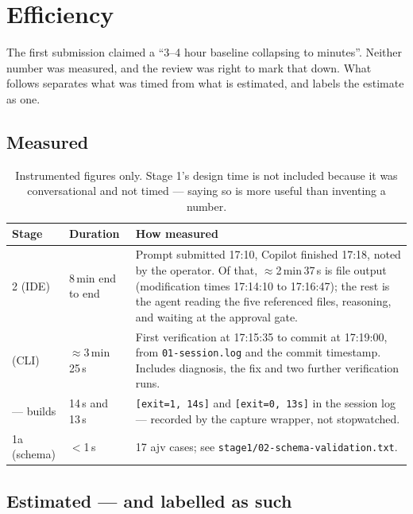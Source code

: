 \documentclass[11pt,a4paper]{article}
\newcommand{\code}[1]{\texttt{\small #1}}
\begin{document}
\section{Efficiency}

The first submission claimed a ``3--4 hour baseline collapsing to minutes''.
Neither number was measured, and the review was right to mark that down. What
follows separates what was timed from what is estimated, and labels the
estimate as one.

\subsection{Measured}

\begin{table}[h]
\centering
\small
\begin{tabularx}{\textwidth}{@{}l l X@{}}
\toprule
\textbf{Stage} & \textbf{Duration} & \textbf{How measured} \\
\midrule
2 (IDE) & 8\,min end to end
  & Prompt submitted 17:10, Copilot finished 17:18, noted by the operator.
    Of that, $\approx$2\,min\,37\,s is file output (modification times
    17:14:10 to 17:16:47); the rest is the agent reading the five referenced
    files, reasoning, and waiting at the approval gate. \\
\addlinespace
3 (CLI) & $\approx$3\,min\,25\,s
  & First verification at 17:15:35 to commit at 17:19:00, from
    \code{01-session.log} and the commit timestamp. Includes diagnosis, the
    fix and two further verification runs. \\
\addlinespace
--- builds & 14\,s and 13\,s
  & \code{[exit=1, 14s]} and \code{[exit=0, 13s]} in the session log ---
    recorded by the capture wrapper, not stopwatched. \\
\addlinespace
1a (schema) & $<$1\,s
  & 17 ajv cases; see \code{stage1/02-schema-validation.txt}. \\
\bottomrule
\end{tabularx}
\caption{Instrumented figures only. Stage 1's design time is not included
because it was conversational and not timed --- saying so is more useful than
inventing a number.}
\end{table}

\subsection{Estimated --- and labelled as such}
\end{document}
